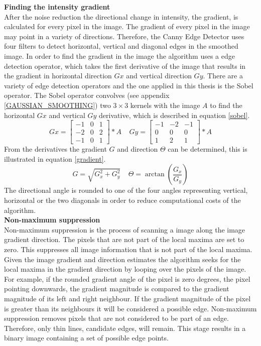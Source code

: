 \documentclass[a4paper]{article}
\begin{document}
\noindent\textbf{Finding the intensity gradient}\\
After the noise reduction the directional change in intensity, the gradient, is calculated for every pixel  in the image. The gradient of every pixel in the image may point in a variety of directions. Therefore, the Canny Edge Detector uses four filters to detect horizontal, vertical and diagonal edges in the smoothed image. In order to find the gradient in the image the algorithm uses a edge detection operator, which takes the first derivative of the image that results in the gradient in horizontal direction $Gx$ and vertical direction $Gy$. There are a variety of edge detection operators and the one applied in this thesis is the Sobel operator. The Sobel operator convolves (see appendix \ref{GAUSSIAN_SMOOTHING}) two $3\times3$ kernels with the image $A$ to find the horizontal $Gx$ and vertical  $Gy$ derivative, which is described in equation \ref{sobel}.
\begin{equation}
\label{sobel}
Gx =
\begin{bmatrix}
-1 & 0 & 1\\
-2 & 0 & 2\\
-1 & 0 & 1
\end{bmatrix}
* A\ \ \ \ \ 
Gy =
\begin{bmatrix}
-1 & -2 & -1\\
0 & 0 & 0\\
1 & 2 & 1
\end{bmatrix}
* A
\end{equation}
From the derivatives the gradient $G$ and direction $\Theta$ can be determined, this is illustrated in equation \ref{gradient}.
\begin{equation}
\label{gradient}
G = \sqrt{G_x^2  + G_y^2}\ \ \ \ \ 
\Theta = \arctan(\frac{G_x}{G_y})
\end{equation}
The directional angle is rounded to one of the four angles representing vertical, horizontal or the two diagonals in order to reduce computational costs of the algorithm.\\ 

\noindent\textbf{Non-maximum suppression}\\
Non-maximum suppression is the process of scanning a image along the image gradient direction. The pixels that are not part of the local maxima are set to zero. This suppresses all image information that is not part of the local maxima. Given the image gradient and direction estimates the algorithm seeks for the local maxima in the gradient direction by looping over the pixels of the image. For example, if the rounded gradient angle of the pixel is zero degrees, the pixel pointing downwards, the gradient magnitude is compared to the gradient magnitude of its left and right neighbour. If the gradient magnitude of the pixel is greater than its neighbours it will be considered a possible edge. Non-maximum suppression removes pixels that are not considered to be part of an edge. Therefore, only thin lines, candidate edges, will remain. This stage results in a binary image containing a set of possible edge points.\\
\end{document}
